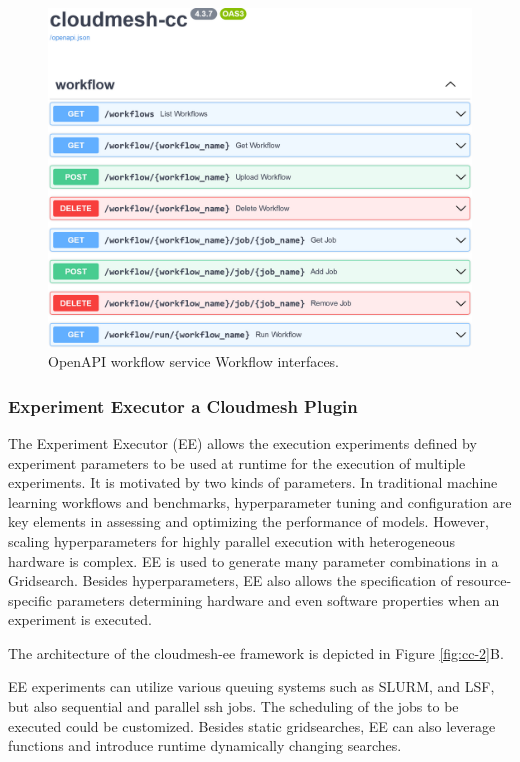\documentclass[utf8]{FrontiersinVancouver} %
\begin{document}
\begin{figure}[htb]
    \centering\includegraphics[width=0.49\columnwidth]{images/fastapi-service-highres.jpg}
      
    \caption{OpenAPI workflow service Workflow interfaces.}
    \label{fig:cc-3}
\end{figure}





\subsubsection{Experiment Executor a Cloudmesh Plugin}

\label{sec:workflow-ee}

The Experiment Executor (EE) \citep{las-frontiers-edu} allows the execution experiments defined by experiment parameters to be used at runtime for the execution of multiple experiments. It is motivated by two kinds of parameters. 
In traditional machine learning workflows and benchmarks, hyperparameter tuning and configuration are key elements in assessing and optimizing the performance of models. However, scaling hyperparameters for highly parallel execution with heterogeneous hardware is complex. EE is used to generate many parameter combinations in a Gridsearch. Besides hyperparameters, EE also allows the specification of resource-specific parameters determining hardware and even software properties when an experiment is executed.

The architecture of the cloudmesh-ee framework is depicted in Figure \ref{fig:cc-2}B.

EE experiments can utilize various queuing systems such as SLURM, and LSF, but also sequential and parallel ssh jobs. The scheduling of the jobs to be executed could be customized. Besides static gridsearches, EE can also leverage functions and introduce runtime dynamically changing searches.
\end{document}
